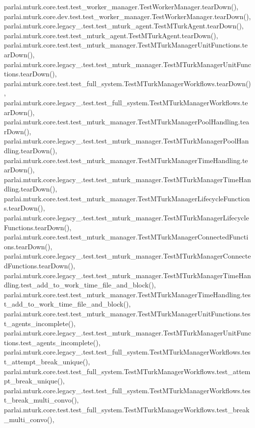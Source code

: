 parlai.\+mturk.\+core.\+test.\+test\+\_\+worker\+\_\+manager.\+Test\+Worker\+Manager.\+tear\+Down(), parlai.\+mturk.\+core.\+dev.\+test.\+test\+\_\+worker\+\_\+manager.\+Test\+Worker\+Manager.\+tear\+Down(), parlai.\+mturk.\+core.\+legacy\+\_.\+test.\+test\+\_\+mturk\+\_\+agent.\+Test\+M\+Turk\+Agent.\+tear\+Down(), parlai.\+mturk.\+core.\+test.\+test\+\_\+mturk\+\_\+agent.\+Test\+M\+Turk\+Agent.\+tear\+Down(), parlai.\+mturk.\+core.\+test.\+test\+\_\+mturk\+\_\+manager.\+Test\+M\+Turk\+Manager\+Unit\+Functions.\+tear\+Down(), parlai.\+mturk.\+core.\+legacy\+\_.\+test.\+test\+\_\+mturk\+\_\+manager.\+Test\+M\+Turk\+Manager\+Unit\+Functions.\+tear\+Down(), parlai.\+mturk.\+core.\+test.\+test\+\_\+full\+\_\+system.\+Test\+M\+Turk\+Manager\+Workflows.\+tear\+Down(), parlai.\+mturk.\+core.\+legacy\+\_.\+test.\+test\+\_\+full\+\_\+system.\+Test\+M\+Turk\+Manager\+Workflows.\+tear\+Down(), parlai.\+mturk.\+core.\+test.\+test\+\_\+mturk\+\_\+manager.\+Test\+M\+Turk\+Manager\+Pool\+Handling.\+tear\+Down(), parlai.\+mturk.\+core.\+legacy\+\_.\+test.\+test\+\_\+mturk\+\_\+manager.\+Test\+M\+Turk\+Manager\+Pool\+Handling.\+tear\+Down(), parlai.\+mturk.\+core.\+test.\+test\+\_\+mturk\+\_\+manager.\+Test\+M\+Turk\+Manager\+Time\+Handling.\+tear\+Down(), parlai.\+mturk.\+core.\+legacy\+\_.\+test.\+test\+\_\+mturk\+\_\+manager.\+Test\+M\+Turk\+Manager\+Time\+Handling.\+tear\+Down(), parlai.\+mturk.\+core.\+test.\+test\+\_\+mturk\+\_\+manager.\+Test\+M\+Turk\+Manager\+Lifecycle\+Functions.\+tear\+Down(), parlai.\+mturk.\+core.\+legacy\+\_.\+test.\+test\+\_\+mturk\+\_\+manager.\+Test\+M\+Turk\+Manager\+Lifecycle\+Functions.\+tear\+Down(), parlai.\+mturk.\+core.\+test.\+test\+\_\+mturk\+\_\+manager.\+Test\+M\+Turk\+Manager\+Connected\+Functions.\+tear\+Down(), parlai.\+mturk.\+core.\+legacy\+\_.\+test.\+test\+\_\+mturk\+\_\+manager.\+Test\+M\+Turk\+Manager\+Connected\+Functions.\+tear\+Down(), parlai.\+mturk.\+core.\+legacy\+\_.\+test.\+test\+\_\+mturk\+\_\+manager.\+Test\+M\+Turk\+Manager\+Time\+Handling.\+test\+\_\+add\+\_\+to\+\_\+work\+\_\+time\+\_\+file\+\_\+and\+\_\+block(), parlai.\+mturk.\+core.\+test.\+test\+\_\+mturk\+\_\+manager.\+Test\+M\+Turk\+Manager\+Time\+Handling.\+test\+\_\+add\+\_\+to\+\_\+work\+\_\+time\+\_\+file\+\_\+and\+\_\+block(), parlai.\+mturk.\+core.\+test.\+test\+\_\+mturk\+\_\+manager.\+Test\+M\+Turk\+Manager\+Unit\+Functions.\+test\+\_\+agents\+\_\+incomplete(), parlai.\+mturk.\+core.\+legacy\+\_.\+test.\+test\+\_\+mturk\+\_\+manager.\+Test\+M\+Turk\+Manager\+Unit\+Functions.\+test\+\_\+agents\+\_\+incomplete(), parlai.\+mturk.\+core.\+legacy\+\_.\+test.\+test\+\_\+full\+\_\+system.\+Test\+M\+Turk\+Manager\+Workflows.\+test\+\_\+attempt\+\_\+break\+\_\+unique(), parlai.\+mturk.\+core.\+test.\+test\+\_\+full\+\_\+system.\+Test\+M\+Turk\+Manager\+Workflows.\+test\+\_\+attempt\+\_\+break\+\_\+unique(), parlai.\+mturk.\+core.\+legacy\+\_.\+test.\+test\+\_\+full\+\_\+system.\+Test\+M\+Turk\+Manager\+Workflows.\+test\+\_\+break\+\_\+multi\+\_\+convo(), parlai.\+mturk.\+core.\+test.\+test\+\_\+full\+\_\+system.\+Test\+M\+Turk\+Manager\+Workflows.\+test\+\_\+break\+\_\+multi\+\_\+convo(), 